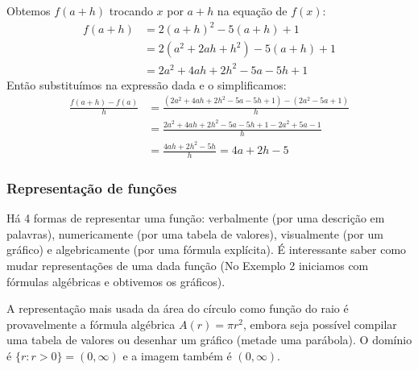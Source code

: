 \solution Obtemos $f(a+h)$ trocando $x$ por $a+h$ na equação de $f(x)$:
$$
\begin{aligned}
f(a+h) &=2(a+h)^2-5(a+h)+1\\
&= 2(a^2+2ah+h^2)-5(a+h)+1\\
&=2a^2+4ah+2h^2-5a-5h+1
\end{aligned}
$$
Então substituímos na expressão dada e o simplificamos: $$
\begin{aligned}
\frac{f(a+h)-f(a)}{h} &= \frac{(2a^2+4ah+2h^2-5a-5h+1)-(2a^2-5a+1)}{h}\\
&=\frac{2a^2+4ah+2h^2-5a-5h+1-2a^2+5a-1}{h}\\
&=\frac{4ah+2h^2-5h}{h}=4a+2h-5
\end{aligned}
$$

\vspace{-0.1cm}
\exampleEnd
\vspace{-0.9cm}

\subsubsection{Representação de funções}
Há 4 formas de representar uma função: verbalmente (por uma descrição em palavras), numericamente (por uma tabela de valores), visualmente (por um gráfico) e algebricamente (por uma fórmula explícita). É interessante saber como mudar representações de uma dada função (No Exemplo 2 iniciamos com fórmulas algébricas e obtivemos os gráficos).

A representação mais usada da área do círculo como função do raio é provavelmente a fórmula algébrica $A(r)=\pi r^2$, embora seja possível compilar uma tabela de valores ou desenhar um gráfico (metade uma parábola). O domínio é $\{r:r>0\}=(0,\infty)$ e a imagem também é $(0,\infty)$.

